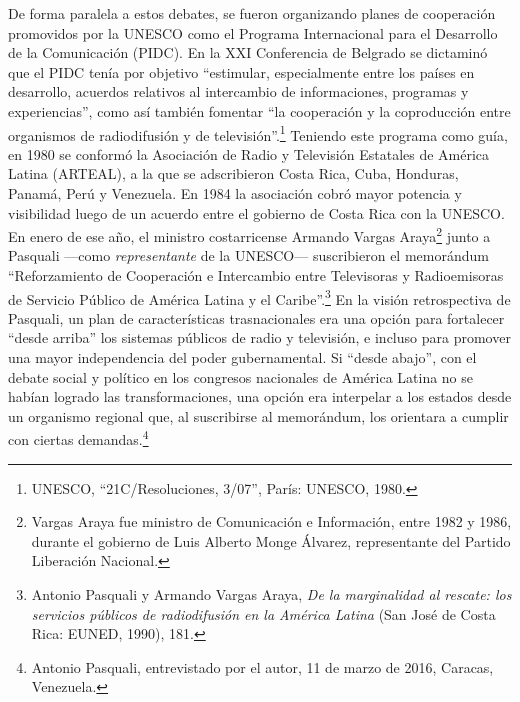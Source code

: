 \documentclass{tufte-handout}
\begin{document}
De forma paralela a estos debates, se fueron organizando planes de
cooperación promovidos por la UNESCO como el Programa Internacional para
el Desarrollo de la Comunicación (PIDC). En la XXI Conferencia de
Belgrado se dictaminó que el PIDC tenía por objetivo ``estimular,
especialmente entre los países en desarrollo, acuerdos relativos al
intercambio de informaciones, programas y experiencias'', como así
también fomentar ``la cooperación y la coproducción entre organismos de
radiodifusión y de televisión''.\footnote{UNESCO, ``21C/Resoluciones,
  3/07'', París: UNESCO, 1980.} Teniendo este programa como guía, en
1980 se conformó la Asociación de Radio y Televisión Estatales de
América Latina (ARTEAL), a la que se adscribieron Costa Rica, Cuba,
Honduras, Panamá, Perú y Venezuela. En 1984 la asociación cobró mayor
potencia y visibilidad luego de un acuerdo entre el gobierno de Costa
Rica con la UNESCO. En enero de ese año, el ministro costarricense
Armando Vargas Araya\footnote{Vargas Araya fue ministro de Comunicación
  e Información, entre 1982 y 1986, durante el gobierno de Luis Alberto
  Monge Álvarez, representante del Partido Liberación Nacional.} junto a
Pasquali ---como \emph{representante} de la UNESCO--- suscribieron el
memorándum ``Reforzamiento de Cooperación e Intercambio entre
Televisoras y Radioemisoras de Servicio Público de América Latina y el
Caribe''.\footnote{Antonio Pasquali y Armando Vargas Araya, \emph{De la
  marginalidad al rescate: los servicios públicos de radiodifusión en la
  América Latina} (San José de Costa Rica: EUNED, 1990), 181.} En la
visión retrospectiva de Pasquali, un plan de características
trasnacionales era una opción para fortalecer ``desde arriba'' los
sistemas públicos de radio y televisión, e incluso para promover una
mayor independencia del poder gubernamental. Si ``desde abajo'', con el
debate social y político en los congresos nacionales de América Latina
no se habían logrado las transformaciones, una opción era interpelar a
los estados desde un organismo regional que, al suscribirse al
memorándum, los orientara a cumplir con ciertas demandas.\footnote{Antonio
  Pasquali, entrevistado por el autor, 11 de marzo de 2016, Caracas,
  Venezuela.}
\end{document}
